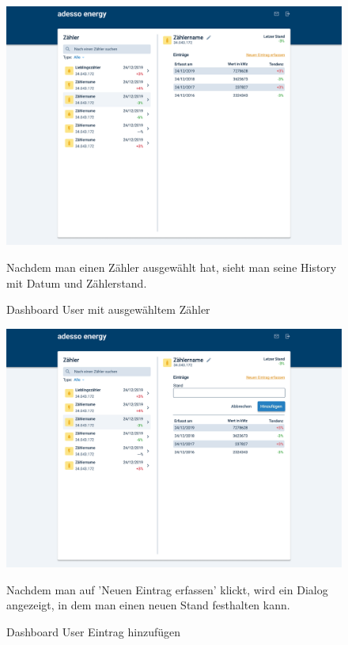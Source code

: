 \newpage

\begin{figure}[h]
	\centering
    \includegraphics[scale=0.3]{img/WebsiteMockup/Dashboard-User-Selected}
	\caption{Dashboard User mit ausgewähltem Zähler} \hfill \break
	Nachdem man einen Zähler ausgewählt hat, sieht man seine History mit Datum und Zählerstand.
\end{figure}

\newpage

\begin{figure}[h]
	\centering
    \includegraphics[scale=0.3]{img/WebsiteMockup/Dashboard-User-Selected-AddEntry}
	\caption{Dashboard User Eintrag hinzufügen} \hfill \break
	Nachdem man auf 'Neuen Eintrag erfassen' klickt, wird ein Dialog angezeigt, in dem man einen neuen Stand festhalten kann.
\end{figure}

